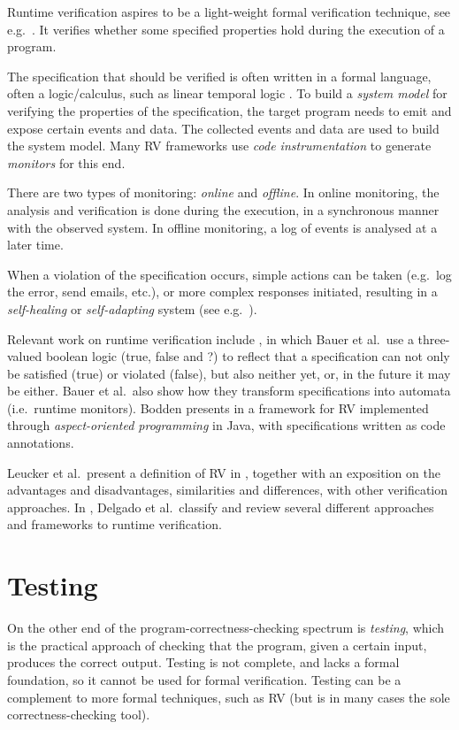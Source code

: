\documentclass[a4paper,11pt]{kth-mag}
\begin{document}
Runtime verification aspires to be a light-weight formal verification
technique, see e.g.\ \cite{leucker09abriefaccount,delgado04taxonomy}. It
verifies whether some specified properties hold during the execution of a
program.

The specification that should be verified is often written in a formal
language, often a logic/calculus, such as linear temporal logic
\cite{pnueli77}. To build a \emph{system model} for verifying the properties of
the specification, the target program needs to emit and expose certain events
and data. The collected events and data are used to build the system model.
Many RV frameworks use \textit{code instrumentation} to generate
\textit{monitors} for this end.

There are two types of monitoring: \emph{online} and \emph{offline}. In online
monitoring, the analysis and verification is done during the execution, in a
synchronous manner with the observed system. In offline monitoring, a log of
events is analysed at a later time.

When a violation of the specification occurs, simple actions can be taken
(e.g.\ log the error, send emails, etc.), or more complex responses initiated,
resulting in a \textit{self-healing} or \textit{self-adapting} system (see
e.g.\ \cite{huebscher08survey}).

Relevant work on runtime verification include \cite{bauer06monitoring}, in
which Bauer et al.\ use a three-valued boolean logic (true, false and ?) to
reflect that a specification can not only be satisfied (true) or violated
(false), but also neither yet, or, in the future it may be either. Bauer et
al.\ also show how they transform specifications into automata (i.e.\ runtime
monitors). Bodden presents in \cite{bodden05efficientrv} a framework for RV
implemented through \emph{aspect-oriented programming} \cite{aspectj} in Java,
with specifications written as code annotations.

Leucker et al.\ present a definition of RV in \cite{leucker09abriefaccount},
together with an exposition on the advantages and disadvantages, similarities
and differences, with other verification approaches. In
\cite{delgado04taxonomy}, Delgado et al.\ classify and review several different
approaches and frameworks to runtime verification.


\section{Testing} \label{section-testing}
On the other end of the program-correctness-checking spectrum is
\emph{testing}, which is the practical approach of checking that the program,
given a certain input, produces the correct output.  Testing is not complete,
and lacks a formal foundation, so it cannot be used for formal verification.
Testing can be a complement to more formal techniques, such as RV (but is in
many cases the sole correctness-checking tool).
\end{document}
